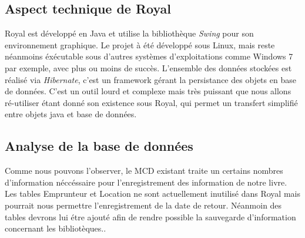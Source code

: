 \subsection{Aspect technique de Royal}
Royal est développé en Java et utilise la bibliothèque \emph{Swing} pour son environnement graphique. 
Le projet à été développé sous Linux, mais reste néanmoins éxécutable sous d'autres systèmes d'exploitations comme Windows 7 par exemple, avec plus ou moins de succès. 
L'ensemble des données stockées est réalisé via \emph{Hibernate}, c'est un framework gérant la persistance des objets en base de données. 
C'est un outil lourd et complexe mais très puissant que nous allons ré-utiliser étant donné son existence sous Royal, qui permet un transfert simplifié entre objets java et base de données.

\subsection{Analyse de la base de données}

Comme nous pouvons l'observer, le MCD existant traite un certains nombres d'information néccéssaire pour l'enregistrement des information de notre livre.
Les tables Emprunteur et Location ne sont actuellement inutilisé dans Royal mais pourrait nous permettre l'enregistrement de la date de retour.
Néanmoin des tables devrons lui étre ajouté afin de rendre possible la sauvegarde d'information concernant les bibliotèques.. 



